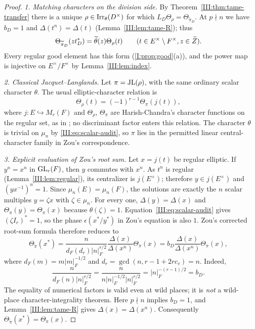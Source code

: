 \begin{proof}
\emph{1. Matching characters on the division side.}
By Theorem~\ref{III:thm:tame-transfer} there is a unique
$\rho\in\operatorname{Irr}_\theta(D^\times)$ for which
$L_D\Theta_\rho=\Theta_{\widetilde\pi_D}$.
At $p\nmid n$ we have $b_D=1$ and
$\Delta(t^n)=\Delta(t)$ (Lemma~\ref{III:lem:tame-R}); thus
\begin{equation}\label{III:eq:div-D2-step}
 \Theta_{\widetilde\pi_D}(z t_D^*)
   =\widetilde\theta(z)\Theta_\rho(t)
 \qquad(t\in E^\times\setminus F^\times,
            z\in\widetilde Z).
\end{equation}
Every regular good element has this form (\cref{I:prop:good}(a)), and the power map is injective on
$E^\times/F^\times$ by Lemma~\ref{III:lem:index}.

\emph{2. Classical Jacquet--Langlands.}
Let $\pi=\mathrm{JL}(\rho)$, with the same ordinary scalar character
$\theta$.  The usual elliptic-character relation is
\begin{equation}\label{III:eq:linear-D2-step}
 \Theta_\rho(t)=(-1)^{r-1}\Theta_\pi(j(t)),
\end{equation}
where $j:E\hookrightarrow M_r(F)$ and $\Theta_\rho$, $\Theta_\pi$
are Harish-Chandra's character functions on the regular set, as in
\cite{DKV84}; no discriminant factor enters this relation.
The character $\theta$ is trivial on $\mu_n$ by
\eqref{III:eq:scalar-audit}, so $\pi$ lies in the permitted
linear central-character family in Zou's correspondence.

\emph{3. Explicit evaluation of Zou's root sum.}
Let $x=j(t)$ be regular elliptic.  If $y^n=x^n$ in
$\operatorname{GL}_r(F)$, then $y$ commutes with $x^n$.  As $t^n$
is regular (Lemma~\ref{III:lem:regular}), its centralizer is
$j(E^\times)$; therefore $y\in j(E^\times)$ and
$(yx^{-1})^n=1$.  Since $\mu_n(E)=\mu_n(F)$, the
solutions are exactly the $n$ scalar multiples
$y=\zeta x$ with $\zeta\in\mu_n$.
For every one, $\Delta(y)=\Delta(x)$ and
$\Theta_\pi(y)=\Theta_\pi(x)$ because
$\theta(\zeta)=1$.  Equation~\eqref{III:eq:scalar-audit}
gives $(\zeta I_r)^*=1$, so the phase
$\epsilon(x^*/y^*)$ in Zou's equation \cite[(3.2)]{Zo23} is also $1$.
Zou's corrected root-sum formula therefore reduces to
\begin{equation}\label{III:eq:zou-D2-step}
 \Theta_{\widetilde\pi}(x^*)
  =\frac{n}{d_F(d_r)|n|_F^{r/2}}
   \frac{\Delta(x)}{\Delta(x^n)}\Theta_\pi(x)
  =b_D\frac{\Delta(x)}{\Delta(x^n)}\Theta_\pi(x),
\end{equation}
where $d_F(m)=m|m|_F^{-1/2}$ and
$d_r=\gcd(n,r-1+2rc_v)=n$.  Indeed,
\[
 \frac{n}{d_F(n)|n|_F^{r/2}}
 =\frac{n}{n|n|_F^{-1/2}|n|_F^{r/2}}
 =|n|_F^{-(r-1)/2}=b_D.
\]
The equality of numerical factors is valid even at wild places;
it is \emph{not} a wild-place character-integrality theorem.
Here $p\nmid n$ implies $b_D=1$, and
Lemma~\ref{III:lem:tame-R} gives $\Delta(x)=\Delta(x^n)$.
Consequently $\Theta_{\widetilde\pi}(x^*)
=\Theta_\pi(x)$.


\end{proof}
